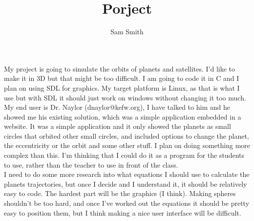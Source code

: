 \documentclass[a4paper,11pt]{article}
\title{Porject}
\author{Sam Smith}
\begin{document}
\maketitle

My project is going to simulate the orbits of planets and satellites. I'd like
 to make it in 3D but that might be too difficult. I am going to code it in C
 and I plan on using SDL for graphics. My target platform is Linux, as that is
 what I use but with SDL it should just work on windows without changing it 
too much. \\
My end user is Dr. Naylor (dnaylor@kefw.org), I have talked to him and he 
showed me his existing solution, which was a simple application embedded in 
a website. It was a simple application and it only showed the planets as small 
circles that orbited other small circles, and included options to change the 
planet, the eccentricity or the orbit and some other stuff. I plan on doing 
something more complex than this. I'm thinking that I could do it as a program 
for the students to use, rather than the teacher to use in front of the class. \\
I need to do some more research into what equations I should use to calculate 
the planets trajectories, but once I decide and I understand it, it should be 
relatively easy to code. The hardest part will be the graphics (I think). 
Making spheres shouldn't be too hard, and once I've worked out the equations it 
should be pretty easy to position them, but I think making a nice user interface 
will be difficult.
 
\end{document}
